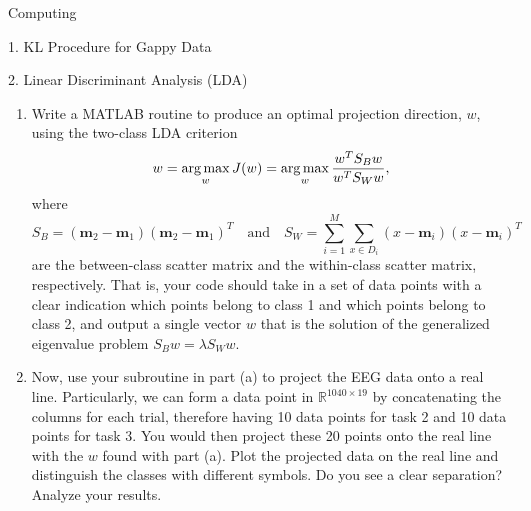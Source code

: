 \begin{section}{Computing}
\begin{homeworkSection}{1. KL Procedure for Gappy Data}
\end{homeworkSection}

\begin{homeworkSection}{2. Linear Discriminant Analysis (LDA)}
\renewcommand{\theenumi}{\alph{enumi}}
\begin{enumerate}
  \item Write a \textsc{MATLAB} routine to produce an optimal projection direction, $w$, using the two-class LDA
    criterion
    $$
        w = \operatorname*{arg\,max}_w J(w) = \operatorname*{arg\,max}_w \frac{w^T S_B w}{w^T S_W w},
    $$
    where
    $$
        S_B = (\bm{m}_2 - \bm{m}_1)(\bm{m}_2 - \bm{m}_1)^T \quad \text{and} \quad
        S_W = \sum_{i=1}^M \sum_{x \in D_i} (x - \bm{m}_i)(x - \bm{m}_i)^T
    $$
    are the between-class scatter matrix and the within-class scatter matrix, respectively. That is, your
    code should take in a set of data points with a clear indication which points belong to class 1 and
    which points belong to class 2, and output a single vector $w$ that is the solution of the generalized
    eigenvalue problem $S_B w = \lambda S_W w$.
  \item Now, use your subroutine in part (a) to project the EEG data onto a real line. Particularly, we can
    form a data point in $\mathbb{R}^{1040×19}$ by concatenating the columns for each trial, therefore having 10 data
    points for task 2 and 10 data points for task 3. You would then project these 20 points onto the
    real line with the $w$ found with part (a). Plot the projected data on the real line and distinguish the
    classes with different symbols. Do you see a clear separation? Analyze your results.
\end{enumerate}
\end{homeworkSection}


\end{section}
